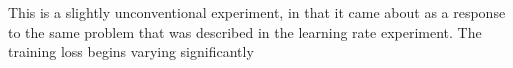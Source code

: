 This is a slightly unconventional experiment, in that it came about as a response to the same problem that was described in the learning rate experiment. The training loss begins varying significantly 